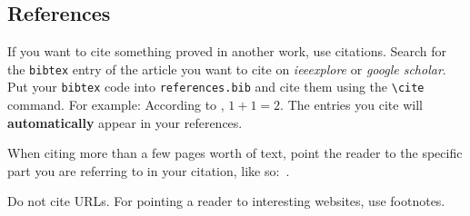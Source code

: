 \documentclass[conference]{IEEEtran}
\begin{document}
%
%
%


%
%

\subsection{References}

If you want to cite something proved in another work, use citations.
Search for the \texttt{bibtex} entry of the article you want to cite on \textit{ieeexplore} or \textit{google scholar}.
Put your \texttt{bibtex} code into \texttt{references.bib} and cite them using the \verb|\cite| command.
For example: According to \cite{akyildiz2002survey}, $1 + 1 = 2$.
The entries you cite will \textbf{automatically} appear in your references.

When citing more than a few pages worth of text, point the reader to the specific part you are referring to in your citation, like so:~\cite[Table IV]{dietrich2009lifetime}.

Do not cite URLs. For pointing a reader to interesting websites, use footnotes.
\end{document}
